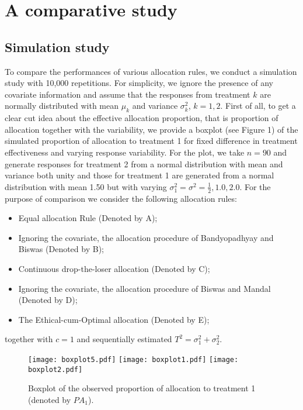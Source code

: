 \section{A comparative study}

\subsection{Simulation study}

To compare the performances of various allocation rules, we conduct a simulation study with 10,000 repetitions. For simplicity, we ignore the presence of any covariate information and assume that the responses from treatment $k$ are normally distributed with mean $\mu_{k}$ and variance $\sigma^{2}_{k}$, $k=1,2$. First of all, to get a clear cut idea about the effective allocation proportion, that is proportion of allocation together with the variability, we provide a boxplot (see Figure 1) of the simulated proportion of allocation  to treatment 1 for fixed difference in treatment effectiveness and varying  response variability. For the plot, we take $n=90$ and generate responses for treatment 2 from a normal distribution with mean and variance both unity and those for treatment 1 are generated from a normal distribution with mean 1.50 but with varying $\sigma_{1}^{2}=\sigma^{2}=\frac{1}{2},1.0, 2.0$. For the purpose of comparison we consider the following allocation rules:
\begin{itemize}
\item Equal allocation Rule (Denoted by A);
\item Ignoring the covariate, the  allocation procedure  of Bandyopadhyay and Biswas\cite{60} (Denoted by B);
\item Continuous drop-the-loser allocation\cite{31} (Denoted by C);
\item Ignoring the covariate, the  allocation procedure of Biswas and Mandal\cite{44} (Denoted by D);
\item The Ethical-cum-Optimal allocation\cite{39} (Denoted by E);
\end{itemize}
together with  $c=1$ and sequentially estimated $T^{2}=\sigma_{1}^{2}+\sigma_{2}^{2}$.


\begin{figure}
\centering
\texttt{[image: boxplot5.pdf]}
\texttt{[image: boxplot1.pdf]}
\texttt{[image: boxplot2.pdf]}
\caption{Boxplot of the observed proportion of allocation to treatment 1 (denoted by $PA_1$).}

\end{figure}

